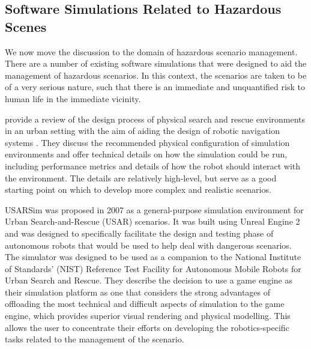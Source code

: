 \subsection{Software Simulations Related to Hazardous Scenes}\label{subsec:RelatedSimulations}
We now move the discussion to the domain of hazardous scenario management. There are a number of existing software simulations that were designed to aid the management of hazardous scenarios. In this context, the scenarios are taken to be of a very serious nature, such that there is an immediate and unquantified risk to human life in the immediate vicinity.

\par \citeauthor{Jacoff2003TestRobots} provide a review of the design process of physical search and rescue environments in an urban setting with the aim of aiding the design of robotic navigation systems \cite{Jacoff2003TestRobots}. They discuss the recommended physical configuration of simulation environments and offer technical details on how the simulation could be run, including performance metrics and details of how the robot should interact with the environment. The details are relatively high-level, but serve as a good starting point on which to develop more complex and realistic scenarios.

USARSim \cite{Carpin2007USARSim:Education} was proposed in 2007 as a general-purpose simulation environment for Urban Search-and-Rescue (USAR) scenarios. It was built using Unreal Engine 2 and was designed to specifically facilitate the design and testing phase of autonomous robots that would be used to help deal with dangerous scenarios. The simulator was designed to be used as a companion to the National Institute of Standards’ (NIST) Reference Test Facility for Autonomous Mobile Robots for Urban Search and Rescue. They describe the decision to use a game engine as their simulation platform as one that considers the strong advantages of offloading the most technical and difficult aspects of simulation to the game engine, which provides superior visual rendering and physical modelling. This allows the user to concentrate their efforts on developing the robotics-specific tasks related to the management of the scenario.\par


